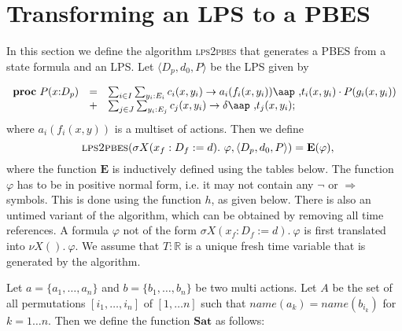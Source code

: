                       

\section{Transforming an LPS to a PBES}

In this section we define the algorithm \textsc{lps2pbes} that generates a
PBES from a state formula and an LPS. Let $\langle {D_{p},d_{0},P}\rangle $
be the LPS given by

\begin{equation*}
\begin{array}{lrl}
\mathbf{proc}~P(x{:}D_{p}) & = & \sum_{i\in
I}\sum_{y_{i}:E_{i}}c_{i}(x,y_{i})\rightarrow a_{i}(f_{i}(x,y_{i}))%
\mbox{\aap ,}t_{i}(x,y_{i})\cdot P(g_{i}(x,y_{i})) \\ 
& + & \sum_{j\in J}\sum_{y_{i}:E_{j}}c_{j}(x,y_{i})\rightarrow \delta %
\mbox{\aap ,}t_{j}(x,y_{i});%
\end{array}%
\end{equation*}%
where $a_{i}(f_{i}(x,y))$ is a multiset of actions. Then we define 
\begin{equation*}
\text{\textsc{lps2pbes}}(\sigma X(x_{f}:D_{f}:=d).~\varphi ,\langle {%
D_{p},d_{0},P}\rangle )=\mathbf{E}(\varphi ),
\end{equation*}%
where the function $\mathbf{E}$ is inductively defined using the tables
below. The function $\varphi $ has to be in positive normal form, i.e. it
may not contain any $\lnot $ or $\Rightarrow $ symbols. This is done using
the function $h$, as given below. There is also an untimed variant of the
algorithm, which can be obtained by removing all time references. A formula $%
\varphi $ not of the form $\sigma X(x_{f}:D_{f}:=d).~\varphi $ is first
translated into $\nu X().~\varphi $. We assume that $T:\mathbb{R}$ is a
unique fresh time variable that is generated by the algorithm.

\vspace{1cm}

Let $a=\{a_{1},\ldots ,a_{n}\}$ and $b=\{b_{1},\ldots ,b_{n}\}$ be two multi
actions. Let $A$ be the set of all permutations $[i_{1},\ldots ,i_{n}]$ of $%
[1,\ldots n]$ such that $name(a_{k})=name(b_{i_{k}})$ for $k=1\ldots n$.
Then we define the function $\mathbf{Sat}$ as follows:

